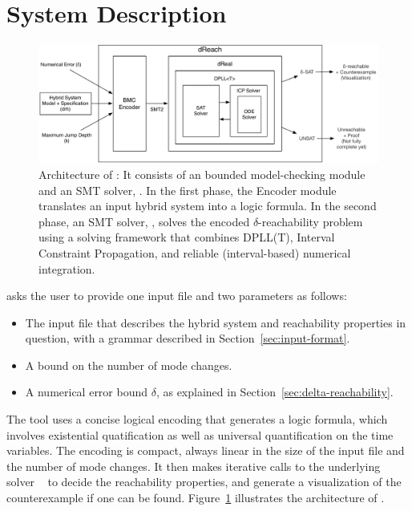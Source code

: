 \section{System Description}\label{sec:system}
\begin{figure}
  \centering
  \includegraphics[width=\textwidth]{images/dreach_archi}
  \caption{Architecture of \dReach{}: It consists of an bounded
    model-checking module and an SMT solver, \dReal{}. In the first
    phase, the Encoder module translates an input hybrid system into a
    logic formula. In the second phase, an
    SMT solver, \dReal{}, solves the encoded $\delta$-reachability
    problem using a solving framework that combines DPLL(T), Interval Constraint Propagation, and reliable (interval-based) numerical integration.
  }\label{fig:system-description}
\end{figure}
\dReach{} asks the user to provide one input file and two parameters as follows:
\begin{itemize}
\item The input file that describes the hybrid system and reachability
  properties in question, with a grammar described in
  Section~\ref{sec:input-format}.
\item A bound on the number of mode changes.
\item A numerical error bound $\delta$, as explained in Section~\ref{sec:delta-reachability}.
\end{itemize}

The tool uses a concise logical encoding that generates a logic formula, which involves existential quatification as well as universal quantification on the time variables. The encoding is compact, always linear in the size of the input file and the number of mode changes. It then makes iterative calls to the underlying solver \dReal{}~\cite{DBLP:conf/cade/GaoKC13} to decide the reachability properties, and generate a visualization of the counterexample if one can be found. Figure~\ref{fig:system-description} illustrates the architecture of
\dReach{}.


